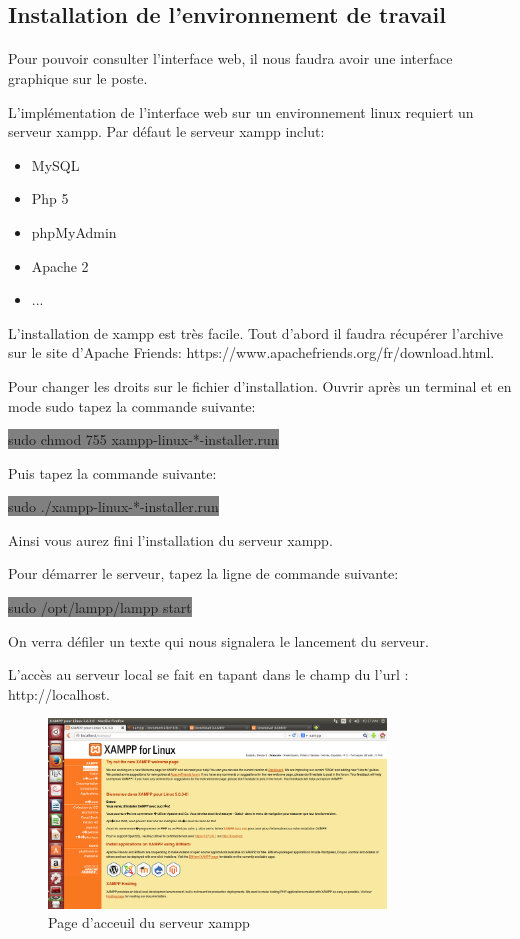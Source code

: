 \documentclass[11pt,a4paper,titlepage, oneside]{article}
\begin{document}
\subsection{{\color{blue}Installation de l'environnement de travail}}
\paragraph{}
	Pour pouvoir consulter l'interface web, il nous faudra avoir une interface graphique sur le poste.
	
	L'implémentation de l'interface web sur un environnement linux requiert un serveur xampp. Par défaut le serveur xampp inclut: \begin{itemize}
	\item{MySQL}
	\item{Php 5}
	\item{phpMyAdmin}
	\item{Apache 2}
	\item{...}
	\end{itemize}
	
	L'installation de xampp est très facile. Tout d'abord il faudra récupérer l'archive sur le site d'Apache Friends: https://www.apachefriends.org/fr/download.html.
	
	Pour changer les droits sur le fichier d'installation. Ouvrir après un terminal et en mode sudo tapez la commande suivante:
	
	\colorbox{gray}{sudo chmod 755 xampp-linux-*-installer.run}
	
	Puis tapez la commande suivante:
	
	\colorbox{gray}{sudo ./xampp-linux-*-installer.run}
	
	Ainsi vous aurez fini l'installation du serveur xampp.
	
	Pour démarrer le serveur, tapez la ligne de commande suivante: 
	
	\colorbox{gray}{sudo /opt/lampp/lampp start}
	
	On verra défiler un texte qui nous signalera le lancement du serveur.
	
	L'accès au serveur local se fait en tapant dans le champ du l'url : http://localhost.
	
	\begin{figure}[h]
                        \centering
                        \includegraphics[width=0.8\textwidth,natwidth=310,natheight=242]{images/xampp.png}
                        \caption{Page d'acceuil du serveur xampp}
    	    \end{figure}
    	    
\end{document}
